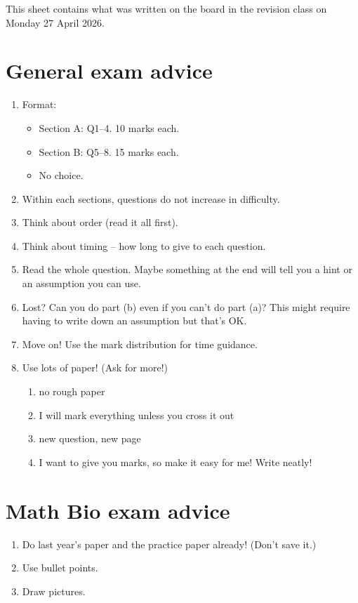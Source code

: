 
 
%
This sheet contains what was written on the board in the revision class on Monday 27 April 2026.

\section{General exam advice}
\begin{enumerate}[label=(\alph*)]
	\item Format: 
		\begin{itemize}
			\item Section A: Q1--4. 10 marks each.
			\item Section B: Q5--8. 15 marks each.
			\item No choice.
		\end{itemize}
	\item Within each sections, questions do not increase in difficulty.
	\item Think about order (read it all first).
	\item Think about timing -- how long to give to each question.
	\item Read the whole question. Maybe something at the end will tell you a hint or an assumption you can use.
	\item Lost? Can you do part (b) even if you can't do part (a)? This might require having to write down an assumption but that's OK.
	\item Move on! Use the mark distribution for time guidance.
	\item Use lots of paper! (Ask for more!)
	\begin{enumerate}[label=(\roman*)]
		\item no rough paper
		\item I will mark everything unless you cross it out
		\item new question, new page
		\item I want to give you marks, so make it easy for me! Write neatly!
	\end{enumerate}
\end{enumerate}	

\section{Math Bio exam advice}
\begin{enumerate}[label=(\alph*)]
	\item Do last year's paper and the practice paper already! (Don't save it.)
	\item Use bullet points.
	\item Draw pictures.
\end{enumerate}

